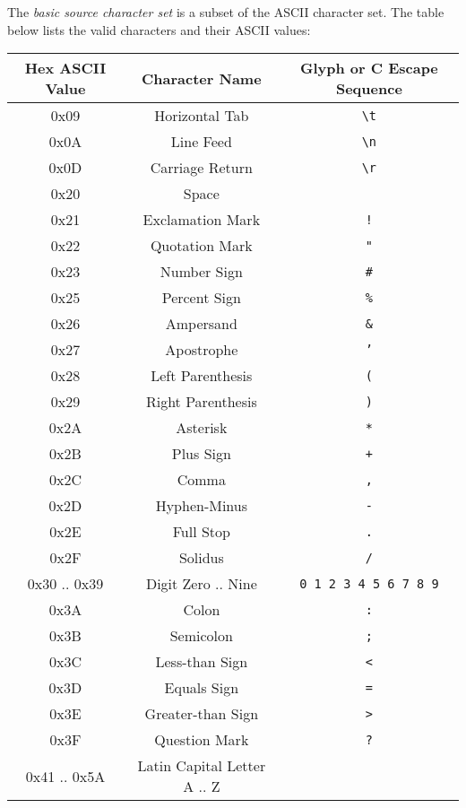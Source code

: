 
\p The \textit{basic source character set} is a subset of the ASCII character set.
The table below lists the valid characters and their ASCII values:

\begin{center}
  \begin{tabular}{|| c | c | c ||}
    \hline
    Hex ASCII Value & Character Name & Glyph or C Escape Sequence \\
    \hline
    0x09 & Horizontal Tab & \texttt{\textbackslash t} \\
    0x0A & Line Feed & \texttt{\textbackslash n} \\
    0x0D & Carriage Return & \texttt{\textbackslash r} \\
    0x20 & Space & \\
    0x21 & Exclamation Mark & \texttt{!}\\
    0x22 & Quotation Mark & \texttt{"}\\
    0x23 & Number Sign & \texttt{\#}\\
    0x25 & Percent Sign & \texttt{\%}\\
    0x26 & Ampersand & \texttt{\&}\\
    0x27 & Apostrophe & \texttt{'}\\
    0x28 & Left Parenthesis & \texttt{(}\\
    0x29 & Right Parenthesis & \texttt{)}\\
    0x2A & Asterisk & \texttt{*}\\
    0x2B & Plus Sign & \texttt{+}\\
    0x2C & Comma & \texttt{,}\\
    0x2D & Hyphen-Minus & \texttt{-}\\
    0x2E & Full Stop & \texttt{.}\\
    0x2F & Solidus & \texttt{/}\\
    0x30 .. 0x39 & Digit Zero .. Nine & \texttt{0 1 2 3 4 5 6 7 8 9}\\
    0x3A & Colon & \texttt{:}\\
    0x3B & Semicolon & \texttt{;}\\
    0x3C & Less-than Sign & \texttt{<}\\
    0x3D & Equals Sign & \texttt{=}\\
    0x3E & Greater-than Sign & \texttt{>}\\
    0x3F & Question Mark & \texttt{?}\\
    0x41 .. 0x5A & Latin Capital Letter A .. Z &

\end{tabular}
\end{center}
